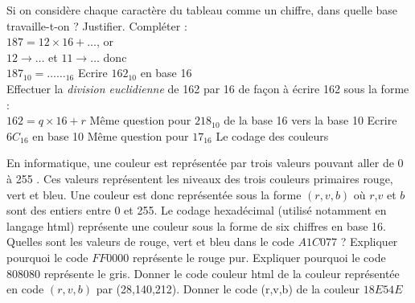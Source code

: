 \documentclass[11pt,a4paper]{article}
\begin{document}
\begin{Exercise}[title={Codage hexadécimal},number=2]
    \subQuestion Si on considère chaque caractère du tableau comme un chiffre, dans quelle base travaille-t-on ? Justifier.
    \subQuestion Compléter : \\
    $ 187 = 12 \times 16 + \dots$, or \\
	$12 \rightarrow \dots$ et $11 \rightarrow  \dots$ donc \\
	$187_{10} = \dots \dots_{16}$ 
    \subQuestion Ecrire $162_{10}$ en base 16 \\
	\aide \; Effectuer la \textit{division euclidienne} de 162 par 16 de façon à écrire 162 sous la forme : \\$162 = q\times 16 + r$
    \subQuestion Même question pour $218_{10}$
    \Question de la base 16 vers la base 10
    \subQuestion Ecrire $6C_{16}$ en base 10
    \subQuestion Même question pour $17_{16}$
    \Question Le codage des couleurs \par
    En informatique, une couleur est représentée par trois valeurs pouvant aller de 0 à 255 . Ces valeurs représentent les niveaux des trois couleurs primaires rouge, vert et bleu. Une couleur est donc représentée sous la forme $(r,v,b)$ où $r$,$v$ et $b$ sont des entiers entre 0 et 255. Le codage hexadécimal (utilisé notamment en langage {\sc html}) représente une couleur sous la forme de six chiffres en base 16.
    \subQuestion Quelles sont les valeurs de rouge, vert et bleu dans le code $A1C077$ ?
    \subQuestion Expliquer pourquoi le code $FF0000$ représente le rouge pur.
    \subQuestion Expliquer pourquoi le code $808080$ représente le gris.
	\subQuestion Donner le code couleur {\sc html} de la couleur représentée en code $(r,v,b)$ par (28,140,212).
	\subQuestion Donner le code (r,v,b) de la couleur $18E54E$

\end{Exercise}
\end{document}
